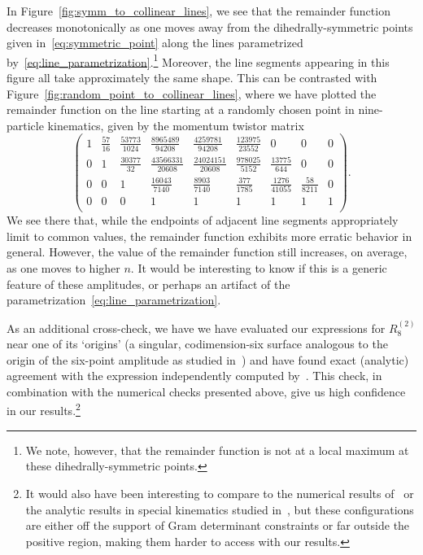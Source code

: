 \documentclass[11pt]{article}
\begin{document}
In Figure~\ref{fig:symm_to_collinear_lines}, we see that the remainder function decreases monotonically as one moves away from the dihedrally-symmetric points given in~\eqref{eq:symmetric_point} along the lines parametrized by~\eqref{eq:line_parametrization}.\footnote{We note, however, that the remainder function is not at a local maximum at these dihedrally-symmetric points.} Moreover, the line segments appearing in this figure all take approximately the same shape. This can be contrasted with Figure~\ref{fig:random_point_to_collinear_lines}, where we have plotted the remainder function on the line starting at a randomly chosen point in nine-particle kinematics, given by the momentum twistor matrix
\begin{equation} \label{eq:random_kinematic_point}
\left(
\begin{array}{ccccccccc}
 1 & \frac{57}{16} & \frac{53773}{1024} & \frac{8965489}{94208} & \frac{4259781}{94208} & \frac{123975}{23552} & 0 & 0 & 0 \\
 0 & 1 & \frac{30377}{32} & \frac{43566331}{20608} & \frac{24024151}{20608} & \frac{978025}{5152} & \frac{13775}{644} & 0 & 0 \\
 0 & 0 & 1 & \frac{16043}{7140} & \frac{8903}{7140} & \frac{377}{1785} & \frac{1276}{41055} & \frac{58}{8211} & 0 \\
 0 & 0 & 0 & 1 & 1 & 1 & 1 & 1 & 1 \\
\end{array}
\right).
\end{equation}
We see there that, while the endpoints of adjacent line segments appropriately limit to common values, the remainder function exhibits more erratic behavior in general. However, the value of the remainder function still increases, on average, as one moves to higher $n$. It would be interesting to know if this is a generic feature of these amplitudes, or perhaps an artifact of the parametrization~\eqref{eq:line_parametrization}.

As an additional cross-check, we have we have evaluated our expressions for $R_8^{(2)}$\! near one of its `origins' (a singular, codimension-six surface analogous to the origin of the six-point amplitude as studied in~\cite{Basso:2020xts}) and have found exact (analytic) agreement with the expression independently computed by~\cite{Lance_correspondance}. This check, in combination with the numerical checks presented above, give us high confidence in our results.\footnote{It would also have been interesting to compare to the numerical results of~\cite{Anastasiou:2009kna,Brandhuber:2009da} or the analytic results in special kinematics studied in~\cite{DelDuca:2010zp,Heslop:2010kq,Gaiotto:2010fk}, but these configurations are either off the support of Gram determinant constraints or far outside the positive region, making them harder to access with our results.}
\end{document}
